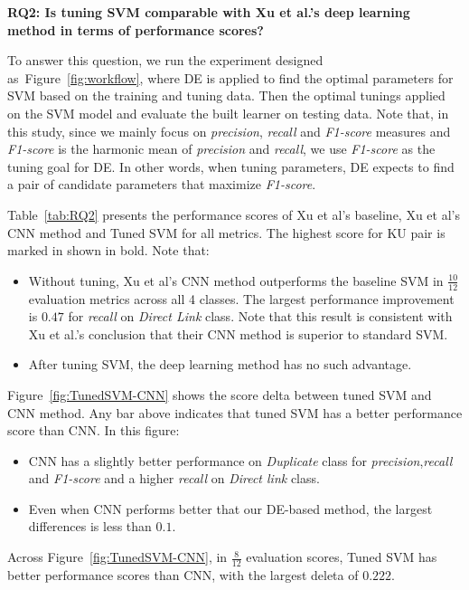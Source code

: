 \documentclass[sigconf,review, anonymous]{acmart}
\theoremstyle{break}
\newcommand{\bi}{\begin{itemize}[leftmargin=0.4cm]}
\newcommand{\ei}{\end{itemize}}
\newcommand{\fig}[1]{Figure~\ref{fig:#1}}
\newcommand{\tab}[1]{Table~\ref{tab:#1}}
\begin{document}
\newpage
\textbf{RQ2: Is tuning SVM comparable with Xu et al.'s deep learning method in terms of performance scores?}

To answer this question, we run the experiment designed as~\fig{workflow}, where DE is applied to 
find the optimal parameters for SVM based on the training and tuning data. Then the optimal tunings
applied on the SVM model and evaluate the built learner on testing data. Note that, in this study,
since we mainly focus on {\it precision}, {\it recall} and {\it F1-score} measures and {\it F1-score} is the
harmonic mean of {\it precision} and {\it recall}, we use {\it F1-score} as the tuning goal for DE.
In other words, when tuning parameters,  DE expects to find a pair of candidate parameters that maximize
{\it F1-score}. 


\tab{RQ2} presents the performance scores of  Xu et al's baseline, Xu et al's CNN method and Tuned SVM 
for all metrics. The highest score for   KU pair
  is marked in shown in bold.  Note that:
\bi
\item
Without tuning, Xu et al's CNN method outperforms
the baseline SVM in $\frac{10}{12}$ evaluation metrics across all 4 classes. 
The largest performance improvement is $0.47$ for {\it recall} on {\it Direct Link} class. Note that this result is consistent with Xu et al.'s conclusion
that their CNN method is superior to standard SVM.
\item
After tuning SVM, the deep learning method has no such advantage.
\ei
\fig{TunedSVM-CNN} 
 shows the score delta between tuned SVM and CNN method. Any bar above indicates that tuned SVM has a better performance score than CNN.
In this figure:
\bi
\item
CNN has a slightly better performance on {\it Duplicate} class for {\it precision},{\it recall} and {\it F1-score} and a higher {\it recall} on {\it Direct link} class. 
\item
Even when CNN performs better that our DE-based method,
the largest differences is less than $0.1$.
\ei
Across \fig{TunedSVM-CNN},
in $\frac{8}{12}$ evaluation scores, Tuned SVM has better performance scores than CNN, with the largest deleta of $0.222$.
\end{document}
